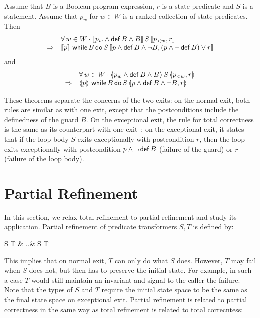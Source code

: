 \documentclass[submission,copyright,creativecommons]{eptcs}
\newcommand{\KW}[1]{\mathop{\sf #1}}
\newcommand{\RAISE}{\KW{raise}}
\newcommand{\WHILE}{\KW{while}}
\newcommand{\DO}{\KW{do}}
\newcommand{\DEF}{\KW{def}}
\newcommand{\con}{\wedge}
\newcommand{\dis}{\vee}
\newcommand{\imp}{\Rightarrow}
\newcommand{\defeq}{\left.\widehat{=}\right.}
\newcommand{\TOTAL}[3]{[\hspace{-.15em}[#1]\hspace{-.15em}]\,#2\,[\hspace{-.15em}[#3]\hspace{-.15em}]}
\newcommand{\PARTIAL}[3]{\langle\hspace{-.2em}|#1|\hspace{-.2em}\rangle\,#2\,\langle\hspace{-.2em}|#3|\hspace{-.2em}\rangle}
\newcommand{\trefby}{\sqsubseteq}
\newcommand{\prefby}{\mathbin{\raisebox{.15em}{$\sqsubset$}\hspace{-.73em}\raisebox{-.3em}{\small$\sim$}}}
\begin{document}
\begin{theorem}
\label{thm:while_corr}
Assume that $B$ is a Boolean program expression, $r$ is a state predicate and $S$ is a statement. Assume that $p_w$ for $w \in W$ is a ranked collection of state predicates. Then
$$\begin{array}{rl}
 & \forall\, w \in W \cdot \TOTAL{p_w \con \DEF B \con B}{S}{p_{<w}, r}\\
\imp & \TOTAL{p}{\WHILE B \DO S}{p \con \DEF B \con \neg B, (p \con \neg \DEF B) \dis r}
\end{array}$$
and
$$\begin{array}{rl}
 & \forall\, w \in W \cdot \PARTIAL{p_w \con \DEF B \con B}{S}{p_{<w}, r}\\
\imp & \PARTIAL{p}{\WHILE B \DO S}{p \con \DEF B \con \neg B, r}
\end{array}$$
\end{theorem}
These theorems separate the concerns of the two exits: on the normal exit, both rules are similar as with one exit, except that the postconditions include the definedness of the guard $B$. On the exceptional exit, the rule for total correctness is the same as its counterpart with one exit~\cite{BackVonWright98RefinementCalculus}; on the exceptional exit, it states that if the loop body $S$ exits exceptionally with postcondition $r$, then the loop exits exceptionally with postcondition $p \con \neg \DEF B$ (failure of the guard) or $r$ (failure of the loop body).

\section{Partial Refinement}
\label{sec:partial}
In this section, we relax total refinement to partial refinement and study its application. Partial refinement of predicate transformers $S, T$ is defined by:
\begin{eqnarr}
  S \prefby T & \defeq & S \sqcap \RAISE \trefby T
\end{eqnarr}This implies that on normal exit, $T$ can only do what $S$ does. However, $T$ may fail when $S$ does not, but then has to preserve the initial state. For example, in such a case $T$ would still maintain an invariant and signal to the caller the failure. Note that the types of $S$ and $T$ require the initial state space to be the same as the final state space on exceptional exit. Partial refinement is related  to partial correctness in the same way as total refinement is related to total correcntess:
\end{document}
